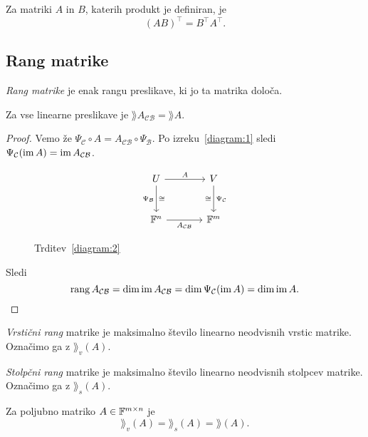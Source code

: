 \documentclass[12pt, a4paper]{article}
\begin{document}
\begin{posledica}
Za matriki $A$ in $B$, katerih produkt je definiran, je
\[
(AB)^\top=B^\top A^\top.
\]
\end{posledica}

\newpage

\subsection{Rang matrike}

\begin{definicija}
\emph{Rang matrike} je enak rangu preslikave, ki jo ta matrika določa.
\end{definicija}

\begin{trditev}\label{diagram:2}
Za vse linearne preslikave je $\rang A_{\mathcal{CB}}=\rang A$.
\end{trditev}

\begin{proof}
Vemo že $\Psi_{\mathcal{C}}\circ A=A_{\mathcal{CB}}\circ\Psi_{\mathcal{B}}$. Po izreku~\ref{diagram:1} sledi $\Psi_{\mathcal{C}}(\operatorname{im} A)=\operatorname{im} A_{\mathcal{CB}}$.

\begin{figure}[H]
\[
\begin{tikzcd}[column sep=large, row sep=large]
U
\arrow[r, "A"]
\arrow[d, "\Psi_{\mathcal{B}}"', "\cong"] & V \arrow[d, "\Psi_{\mathcal{C}}", "\cong"'] \\
\F^n \arrow[r, "A_{\mathcal{CB}}"'] & \F^m
\end{tikzcd}
\]
\caption{Trditev~\ref{diagram:2}}
\end{figure}

Sledi
\[
\operatorname{rang} A_{\mathcal{CB}}=\dim\operatorname{im} A_{\mathcal{CB}}=\dim \Psi_{\mathcal{C}}(\operatorname{im} A)=\dim\operatorname{im} A.\qedhere
\]
\end{proof}

\begin{definicija}
\emph{Vrstični rang} matrike je maksimalno število linearno neodvisnih vrstic matrike. Označimo ga z $\rang_v(A)$.

\emph{Stolpčni rang} matrike je maksimalno število linearno neodvisnih stolpcev matrike. Označimo ga z $\rang_s(A)$.
\end{definicija}

\begin{izrek}
Za poljubno matriko $A\in\mathbb{F}^{m\times n}$ je
\[
\rang_v(A)=\rang_s(A)=\rang(A).
\]
\end{izrek}
\end{document}
